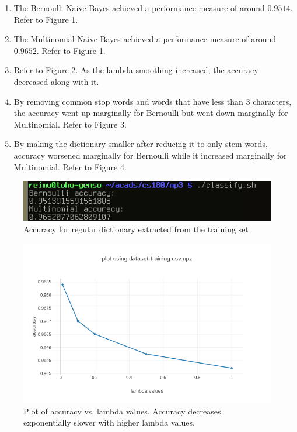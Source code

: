 \documentclass{article}
\begin{document}
	\begin{enumerate}
		\item 
			The Bernoulli Naive Bayes achieved a performance measure of 
			around $0.9514$. Refer to Figure 1.
		\item 
			The Multinomial Naive Bayes achieved a performance measure of 
			around $0.9652$. Refer to Figure 1.
		\item 
			Refer to Figure 2. As the lambda smoothing increased, 
			the accuracy decreased along with it.
		\item
			By removing common stop words and words that have less than 3
			characters, the accuracy went up marginally for Bernoulli but went
			down marginally for Multinomial. Refer to Figure 3.
		\item 
			By making the dictionary smaller after reducing it to only stem
			words, accuracy worsened marginally for Bernoulli while it
			increased marginally for Multinomial. Refer to Figure 4.
	\end{enumerate}
	\begin{figure}[h]
		\centering
		\includegraphics{regular.png}
		\caption{Accuracy for regular dictionary extracted from the training
		set}
	\end{figure}
	\begin{figure}[h]
		\centering
		\includegraphics{newplot.png}
		\caption{Plot of accuracy vs. lambda values. Accuracy decreases 
		exponentially slower with higher lambda values.}
	\end{figure}
\end{document}
